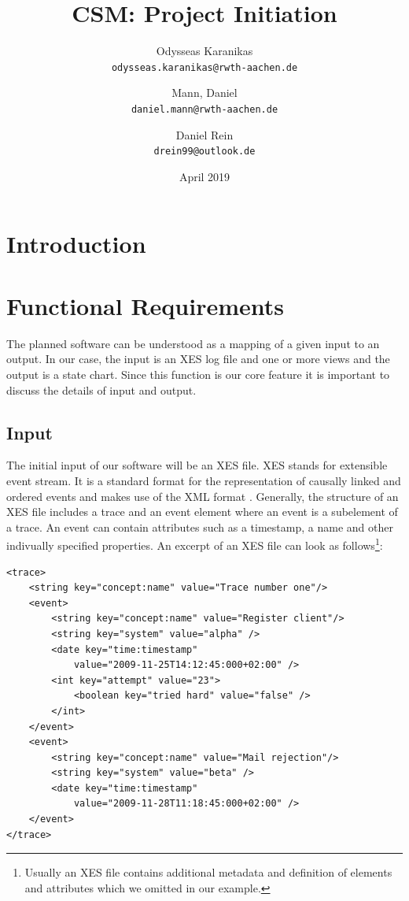 \documentclass[12pt]{extarticle}
\title{CSM: Project Initiation}
\author{
Odysseas Karanikas\\
\texttt{odysseas.karanikas@rwth-aachen.de}
\and
Mann, Daniel\\
\texttt{daniel.mann@rwth-aachen.de}
\and
Daniel Rein\\
\texttt{drein99@outlook.de}
}
\date{April 2019}
\begin{document}
\maketitle

\section{Introduction}


\section{Functional Requirements}
\label{sec:FR}

The planned software can be understood as a mapping of a given input to an output. In our case, the input is an XES log file and one or more views and the output is a state chart. Since this function is our core feature it is important to discuss the details of input and output.

\subsection{Input}

The initial input of our software will be an XES file. XES stands for extensible event stream. It is a standard format for the representation of causally linked and ordered events and makes use of the XML format \cite{xes}. Generally, the structure of an XES file includes a trace and an event element where an event is a subelement of a trace. An event can contain attributes such as a timestamp, a name and other indivually specified properties. An excerpt of an XES file can look as follows\footnote{Usually an XES file contains additional metadata and definition of elements and attributes which we omitted in our example.}:

\begin{lstlisting}
<trace>
    <string key="concept:name" value="Trace number one"/>
    <event>
        <string key="concept:name" value="Register client"/>
        <string key="system" value="alpha" />
        <date key="time:timestamp" 
            value="2009-11-25T14:12:45:000+02:00" />
        <int key="attempt" value="23">
            <boolean key="tried hard" value="false" />
        </int>
    </event>
    <event>
        <string key="concept:name" value="Mail rejection"/>
        <string key="system" value="beta" />
        <date key="time:timestamp" 
            value="2009-11-28T11:18:45:000+02:00" />
    </event>
</trace>
\end{lstlisting}
\end{document}
